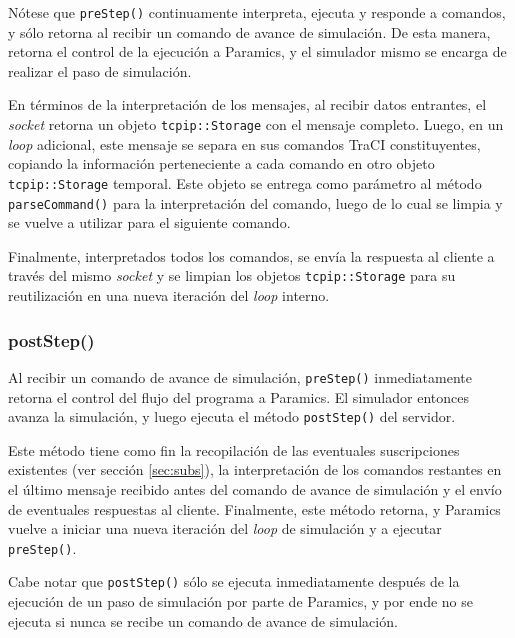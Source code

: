

Nótese que \texttt{preStep()} continuamente interpreta, ejecuta y responde a comandos, y sólo retorna al recibir un comando de avance de simulación. De esta manera, retorna el control de la ejecución a Paramics, y el simulador mismo se encarga de realizar el paso de simulación.

En términos de la interpretación de los mensajes, al recibir datos entrantes, el \emph{socket} retorna un objeto \texttt{tcpip::Storage} con el mensaje completo. Luego, en un \emph{loop} adicional, este mensaje se separa en sus comandos TraCI constituyentes, copiando la información perteneciente a cada comando en otro objeto \texttt{tcpip::Storage} temporal. Este objeto se entrega como parámetro al método \texttt{parseCommand()} para la interpretación del comando, luego de lo cual se limpia y se vuelve a utilizar para el siguiente comando.

Finalmente, interpretados todos los comandos, se envía la respuesta al cliente a través del mismo \emph{socket} y se limpian los objetos \texttt{tcpip::Storage} para su reutilización en una nueva iteración del \emph{loop} interno.

\subsubsection{postStep()} \label{sec:poststep}

Al recibir un comando de avance de simulación, \texttt{preStep()} inmediatamente retorna el control del flujo del programa a Paramics. El simulador entonces avanza la simulación, y luego ejecuta el método \texttt{postStep()} del servidor.

Este método tiene como fin la recopilación de las eventuales suscripciones existentes (ver sección \ref{sec:subs}), la interpretación de los comandos restantes en el último mensaje recibido antes del comando de avance de simulación y el envío de eventuales respuestas al cliente. Finalmente, este método retorna, y Paramics vuelve a iniciar una nueva iteración del \emph{loop} de simulación y a ejecutar \texttt{preStep()}.

Cabe notar que \texttt{postStep()} sólo se ejecuta inmediatamente después de la ejecución de un paso de simulación por parte de Paramics, y por ende no se ejecuta si nunca se recibe un comando de avance de simulación.

